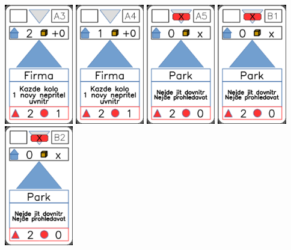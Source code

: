 \documentclass[a4paper]{article}
\begin{document}
	\includegraphics[width=3.0cm]{img-2_17}
	\includegraphics[width=3.0cm]{img-2_18}
	\includegraphics[width=3.0cm]{img-2_19}
	\includegraphics[width=3.0cm]{img-2_20}
	\includegraphics[width=3.0cm]{img-2_21}
\end{document}
